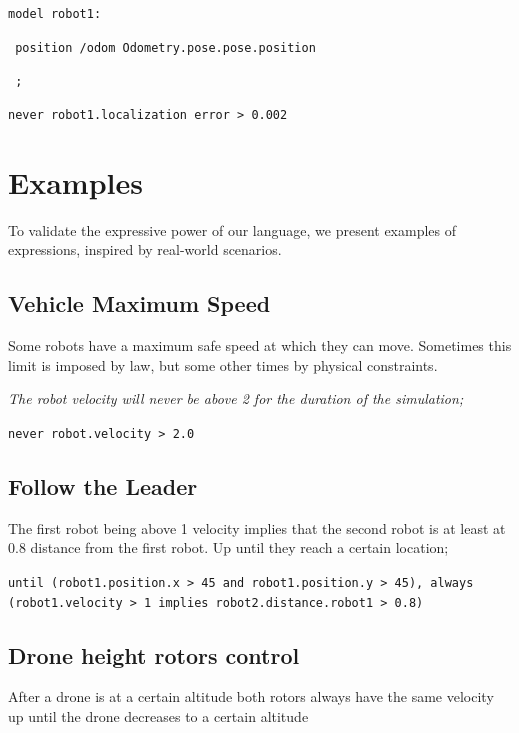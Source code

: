 \documentclass[runningheads]{llncs}
\begin{document}
\vspace{3mm}

\texttt{model robot1:}

\texttt{    position /odom Odometry.pose.pose.position}

\texttt{    ;}

\vspace{3mm}

\texttt{never robot1.localization error > 0.002}


\section{Examples}

To validate the expressive power of our language, we present examples of expressions, inspired by real-world scenarios.


\subsection{Vehicle Maximum Speed}

Some robots have a maximum safe speed at which they can move. Sometimes this limit is imposed by law, but some other times by physical constraints.


\textit{The robot velocity will never be above 2 for the duration of the simulation;}

\vspace{3mm}

\texttt{never robot.velocity > 2.0}

\subsection{Follow the Leader}

The first robot being above 1 velocity implies that the second robot is at least at 0.8 distance from the first robot. Up until they reach a certain location;

\vspace{3mm}

\texttt{until (robot1.position.x > 45 and robot1.position.y > 45), always (robot1.velocity > 1 implies robot2.distance.robot1 > 0.8)}


\subsection{Drone height rotors control}

After a drone is at a certain altitude both rotors always have the same velocity up until the drone decreases to a certain altitude
\end{document}
